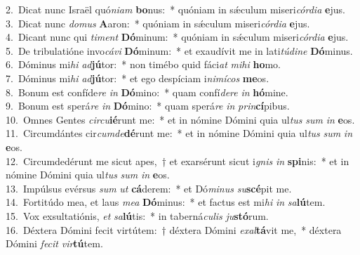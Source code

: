 {2.~}Dicat nunc Israël quó\textit{ni}\textit{am} \textbf{bo}nus:~* quóniam in sǽculum miseri\textit{cór}\textit{di}\textit{a} \textbf{e}jus.\\
{3.~}Dicat nunc \textit{do}\textit{mus} \textbf{A}aron:~* quóniam in sǽculum miseri\textit{cór}\textit{di}\textit{a} \textbf{e}jus.\\
{4.~}Dicant nunc qui \textit{ti}\textit{ment} \textbf{Dó}minum:~* quóniam in sǽculum miseri\textit{cór}\textit{di}\textit{a} \textbf{e}jus.\\
{5.~}De tribulatióne invo\textit{cá}\textit{vi} \textbf{Dó}minum:~* et exaudívit me in lati\textit{tú}\textit{di}\textit{ne} \textbf{Dó}minus.\\
{6.~}Dóminus mi\textit{hi} \textit{ad}\textbf{jú}tor:~* non timébo quid fáci\textit{at} \textit{mi}\textit{hi} \textbf{ho}mo.\\
{7.~}Dóminus mi\textit{hi} \textit{ad}\textbf{jú}tor:~* et ego despíciam i\textit{ni}\textit{mí}\textit{cos} \textbf{me}os.\\
{8.~}Bonum est confíde\textit{re} \textit{in} \textbf{Dó}mino:~* quam confí\textit{de}\textit{re} \textit{in} \textbf{hó}mine.\\
{9.~}Bonum est sperá\textit{re} \textit{in} \textbf{Dó}mino:~* quam sperá\textit{re} \textit{in} \textit{prin}\textbf{cí}pibus.\\
{10.~}Omnes Gentes \textit{cir}\textit{cu}\textbf{ié}runt me:~* et in nómine Dómini quia ul\textit{tus} \textit{sum} \textit{in} \textbf{e}os.\\
{11.~}Circumdántes cir\textit{cum}\textit{de}\textbf{dé}runt me:~* et in nómine Dómini quia ul\textit{tus} \textit{sum} \textit{in} \textbf{e}os.\\
{12.~}Circumdedérunt me sicut apes,~† et exarsérunt sicut i\textit{gnis} \textit{in} \textbf{spi}nis:~* et in nómine Dómini quia ul\textit{tus} \textit{sum} \textit{in} \textbf{e}os.\\
{13.~}Impúlsus evérsus \textit{sum} \textit{ut} \textbf{cá}derem:~* et Dó\textit{mi}\textit{nus} \textit{su}\textbf{scé}pit me.\\
{14.~}Fortitúdo mea, et laus \textit{me}\textit{a} \textbf{Dó}minus:~* et factus est mi\textit{hi} \textit{in} \textit{sa}\textbf{lú}tem.\\
{15.~}Vox exsultatiónis, \textit{et} \textit{sa}\textbf{lú}tis:~* in taberná\textit{cu}\textit{lis} \textit{ju}\textbf{stó}rum.\\
{16.~}Déxtera Dómini fecit virtútem:~† déxtera Dómini \textit{e}\textit{xal}\textbf{tá}vit me,~* déxtera Dómini \textit{fe}\textit{cit} \textit{vir}\textbf{tú}tem.\\
